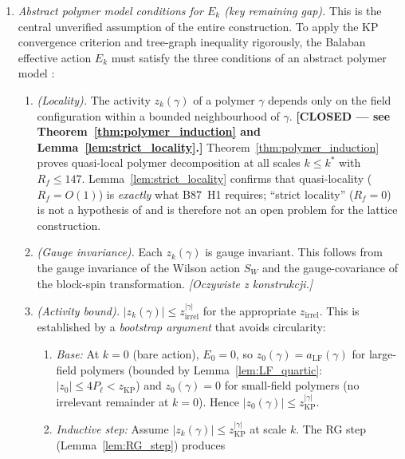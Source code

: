 \documentclass[11pt,a4paper]{amsart}
\theoremstyle{definition}
\newcommand{\zKP}{z_{\mathrm{KP}}}
\begin{document}
\begin{enumerate}[label=(\alph*)]
\item \emph{Abstract polymer model conditions for $E_k$ (key remaining gap).}
      This is the central unverified assumption of the entire construction.
      To apply the KP convergence criterion and tree-graph inequality rigorously,
      the Balaban effective action $E_k$ must satisfy the three conditions of an
      abstract polymer model \cite[Def.~2.1]{KP86}:
      \begin{enumerate}[label=(d-\arabic*)]
      \item \emph{(Locality).} The activity $z_k(\gamma)$ of a polymer $\gamma$
            depends only on the field configuration within a bounded neighbourhood
            of $\gamma$.
            \textbf{[CLOSED --- see Theorem~\ref{thm:polymer_induction} and
            Lemma~\ref{lem:strict_locality}.]}
            Theorem~\ref{thm:polymer_induction} proves quasi-local polymer
            decomposition at all scales $k \le k^*$ with $R_f \le 147$.
            Lemma~\ref{lem:strict_locality} confirms that quasi-locality
            ($R_f = O(1)$) is \emph{exactly} what B87~H1 requires; ``strict
            locality'' ($R_f = 0$) is not a hypothesis of \cite[Thm.~2.1]{B87}
            and is therefore not an open problem for the lattice construction.
      \item \emph{(Gauge invariance).} Each $z_k(\gamma)$ is gauge invariant.
            This follows from the gauge invariance of the Wilson action $S_W$
            and the gauge-covariance of the block-spin transformation.
            \emph{[Oczywiste z konstrukcji.]}
      \item \emph{(Activity bound).} $|z_k(\gamma)| \le z_{\mathrm{irrel}}^{|\gamma|}$
            for the appropriate $z_{\mathrm{irrel}}$.  This is established by
            a \emph{bootstrap argument} that avoids circularity:
            \begin{enumerate}[label=(\roman*)]
            \item \emph{Base:} At $k=0$ (bare action), $E_0 = 0$, so
              $z_0(\gamma) = a_{\mathrm{LF}}(\gamma)$ for large-field polymers
              (bounded by Lemma~\ref{lem:LF_quartic}: $|z_0| \le 4P_\ell < \zKP$)
              and $z_0(\gamma) = 0$ for small-field polymers (no irrelevant
              remainder at $k=0$).  Hence $|z_0(\gamma)| \le \zKP^{|\gamma|}$. \checkmark
            \item \emph{Inductive step:} Assume $|z_k(\gamma)| \le \zKP^{|\gamma|}$
              at scale $k$.  The RG step (Lemma~\ref{lem:RG_step}) produces

\end{enumerate}
\end{enumerate}
\end{enumerate}
\end{document}
